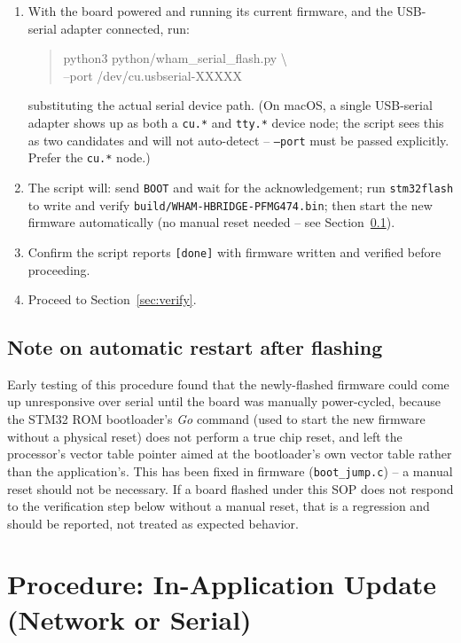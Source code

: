 \documentclass[11pt]{article}
\newcommand{\code}[1]{\texttt{#1}}
\begin{document}
\begin{enumerate}[label=\arabic*.]
  \item With the board powered and running its current firmware, and the
    USB-serial adapter connected, run:
\begin{quote}\ttfamily\small\raggedright
python3 python/wham\_serial\_flash.py \textbackslash\\
\hspace*{1em}--port /dev/cu.usbserial-XXXXX
\end{quote}
    substituting the actual serial device path. (On macOS, a single
    USB-serial adapter shows up as both a \code{cu.*} and \code{tty.*}
    device node; the script sees this as two candidates and will not
    auto-detect -- \code{--port} must be passed explicitly. Prefer the
    \code{cu.*} node.)
  \item The script will: send \code{BOOT} and wait for the
    acknowledgement; run \code{stm32flash} to write and verify
    \code{build/WHAM-HBRIDGE-PFMG474.bin}; then start the new firmware
    automatically (no manual reset needed -- see
    Section~\ref{sec:reset-note}).
  \item Confirm the script reports \texttt{[done]} with firmware
    written and verified before proceeding.
  \item Proceed to Section~\ref{sec:verify}.
\end{enumerate}

\subsection{Note on automatic restart after flashing}
\label{sec:reset-note}

Early testing of this procedure found that the newly-flashed firmware
could come up unresponsive over serial until the board was manually
power-cycled, because the STM32 ROM bootloader's \emph{Go} command (used
to start the new firmware without a physical reset) does not perform a
true chip reset, and left the processor's vector table pointer aimed at
the bootloader's own vector table rather than the application's. This
has been fixed in firmware (\code{boot\_jump.c}) -- a manual reset should
not be necessary. If a board flashed under this SOP does not respond to
the verification step below without a manual reset, that is a
regression and should be reported, not treated as expected behavior.

\section{Procedure: In-Application Update (Network or Serial)}
\label{sec:fwupdate}
\end{document}
